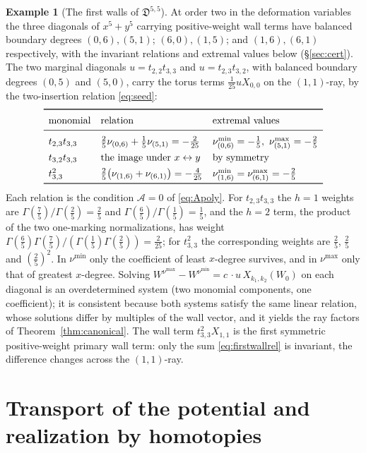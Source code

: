 \documentclass[11pt]{amsart}
\theoremstyle{definition}
\newtheorem{example}[theorem]{Example}
\theoremstyle{remark}
\newcommand{\Dscr}{\mathfrak{D}}
\newcommand{\Ascr}{\mathcal{A}}
\begin{document}
\begin{example}[The first walls of $\Dscr^{5,5}$]
\label{ex:walls}
At order two in the deformation variables the three diagonals of
$x^{5}+y^{5}$ carrying positive-weight wall terms have balanced boundary degrees
$(0,6),(5,1)$; $(6,0),(1,5)$; and $(1,6),(6,1)$ respectively, with the
invariant relations and extremal values below (\S\ref{sec:cert}).  The two
marginal diagonals $u=t_{2,2}t_{3,3}$ and $u=t_{2,3}t_{3,2}$, with balanced
boundary degrees $(0,5)$ and $(5,0)$, carry the torus terms $\tfrac1{25}uX_{0,0}$
on the $(1,1)$-ray, by the two-insertion relation \eqref{eq:seed}:
{\small
\[
\renewcommand{\arraystretch}{1.35}
\begin{array}{lll}
\toprule
\text{monomial} & \text{relation} & \text{extremal values}\\
\midrule
t_{2,3}t_{3,3} &
\tfrac25\nu_{(0,6)}+\tfrac15\nu_{(5,1)}=-\tfrac2{25} &
\nu^{\min}_{(0,6)}=-\tfrac15,\ \nu^{\max}_{(5,1)}=-\tfrac25\\
t_{3,2}t_{3,3} & \text{the image under $x\leftrightarrow y$} & \text{by symmetry}\\
t_{3,3}^{2} &
\tfrac25\bigl(\nu_{(1,6)}+\nu_{(6,1)}\bigr)=-\tfrac4{25} &
\nu^{\min}_{(1,6)}=\nu^{\max}_{(6,1)}=-\tfrac25\\
\bottomrule
\end{array}
\]
}
Each relation is the condition $\Ascr=0$ of \eqref{eq:Apoly}.  For
$t_{2,3}t_{3,3}$ the $h=1$ weights are
$\Gamma(\tfrac75)/\Gamma(\tfrac25)=\tfrac25$ and
$\Gamma(\tfrac65)/\Gamma(\tfrac15)=\tfrac15$, and the $h=2$ term, the product
of the two one-marking normalizations, has weight
$\Gamma(\tfrac65)\Gamma(\tfrac75)/(\Gamma(\tfrac15)\Gamma(\tfrac25))=\tfrac2{25}$;
for $t_{3,3}^{2}$ the corresponding weights are $\tfrac25$, $\tfrac25$ and
$(\tfrac25)^2$.  In $\nu^{\min}$ only the coefficient of least $x$-degree
survives, and in $\nu^{\max}$ only that of greatest $x$-degree.  Solving
$W^{\nu^{\max}}-W^{\nu^{\min}}=c\,\cdot u\,X_{k_{1},k_{2}}(W_{0})$ on each
diagonal is an overdetermined system (two monomial components, one
coefficient); it is consistent because both systems satisfy the same linear
relation, whose solutions differ by multiples of the wall vector, and it
yields the ray factors of Theorem~\ref{thm:canonical}. The wall term
$t_{3,3}^{2}X_{1,1}$ is the first symmetric positive-weight primary wall term:
only the sum \eqref{eq:firstwallrel} is invariant,
the difference changes across the $(1,1)$-ray.
\end{example}

\section{Transport of the potential and realization by homotopies}
\label{sec:geometric}
\end{document}
